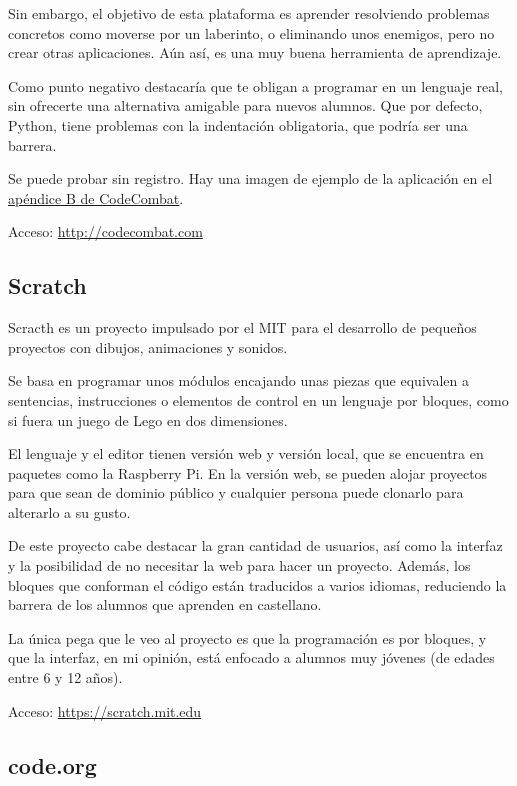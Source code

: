 \documentclass{report}
\begin{document}
	Sin embargo, el objetivo de esta plataforma es aprender resolviendo problemas concretos como moverse por un laberinto, o eliminando unos enemigos, pero no crear otras aplicaciones. Aún así, es una muy buena herramienta de aprendizaje.
	
	Como punto negativo destacaría que te obligan a programar en un lenguaje real, sin ofrecerte una alternativa amigable para nuevos alumnos. Que por defecto, Python, tiene problemas con la indentación obligatoria, que podría ser una barrera.
	
	Se puede probar sin registro. Hay una imagen de ejemplo de la aplicación en el \hyperref[app:b]{apéndice B de CodeCombat}.
	
	\hfill
	
	Acceso: \url{http://codecombat.com}
	
	\subsection{Scratch}
	
	Scracth es un proyecto impulsado por el MIT para el desarrollo de pequeños proyectos con dibujos, animaciones y sonidos. 
	
	Se basa en programar unos módulos encajando unas piezas que equivalen a sentencias, instrucciones o elementos de control en un lenguaje
	por bloques, como si fuera un juego de Lego en dos dimensiones.
	
	El lenguaje y el editor tienen versión web y versión local, que se encuentra en paquetes como la Raspberry Pi. En la versión web, se pueden alojar proyectos para que 
	sean de dominio público y cualquier persona puede clonarlo para alterarlo a su gusto.
	
	De este proyecto cabe destacar la gran cantidad de usuarios, así como la interfaz y la posibilidad de no necesitar la web para hacer un proyecto. Además, los bloques que conforman el código están traducidos a varios idiomas, reduciendo la barrera de los alumnos que aprenden en castellano.
	
	La única pega que le veo al proyecto es que la programación es por bloques, y que la interfaz, en mi opinión, está enfocado a alumnos muy jóvenes (de edades entre 6 y 12 años). 
	
	\hfill
	
	Acceso: \url{https://scratch.mit.edu}
	
	\subsection{code.org}
	
\end{document}
